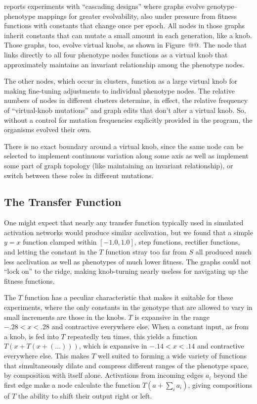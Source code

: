 \documentclass[letterpaper]{article}
\begin{document}
\citet{kovitz2015experiments} reports experiments with ``cascading designs''
where graphs evolve genotype--phenotype mappings for greater evolvability, also
under pressure from fitness functions with constants that change once per epoch.
All nodes in those graphs inherit constants that can mutate a small amount in
each generation, like a knob. Those graphs, too, evolve virtual knobs, as shown
in Figure~@@. The node that links directly to all four phenotype nodes functions
as a virtual knob that approximately maintains an invariant relationship
among the phenotype nodes.

The other nodes, which occur in clusters, function as a large virtual knob for
making fine-tuning adjustments to individual phenotype nodes.  The relative
numbers of nodes in different clusters determine, in effect, the relative
frequency of ``virtual-knob mutations'' and graph edits that don't alter a
virtual knob. So, without a control for mutation frequencies explicitly provided
in the program, the organisms evolved their own.

There is no exact boundary around a virtual knob, since the same node can be
selected to implement continuous variation along some axis as well as implement
some part of graph topology (like maintaining an invariant relationship), or
switch between these roles in different mutations.

\subsection{The Transfer Function}

One might expect that nearly any transfer function typically used in simulated
activation networks would produce similar acclivation, but we found that a
simple $y=x$ function clamped within $[-1.0, 1.0]$, step functions, rectifier
functions, and letting the constant in the $T$ function stray too far from $S$
all produced much less acclivation as well as phenotypes of much lower fitness.
The graphs could not ``lock on'' to the ridge, making knob-turning nearly
useless for navigating up the fitness functions.

The $T$ function has a peculiar characteristic that makes it suitable for
these experiments, where the only constants in the genotype that are allowed to
vary in small increments are those in the knobs. $T$ is expansive in the range
$-.28 < x < .28$ and contractive everywhere else. When a constant input, as
from a knob, is fed into $T$ repeatedly ten times, this yields a function
$T(x+T(x+(\ldots)))$, which is expansive in $-.14 < x < .14$ and contractive
everywhere else. This makes $T$ well suited to forming a wide variety of
functions that simultaneously dilate and compress different ranges of the
phenotype space, by composition with itself alone. Activations from incoming
edges $a_{i}$ beyond the first edge make a node calculate the function $T(a +
\sum_i a_i)$, giving compositions of $T$ the ability to shift their output
right or left.
\end{document}
